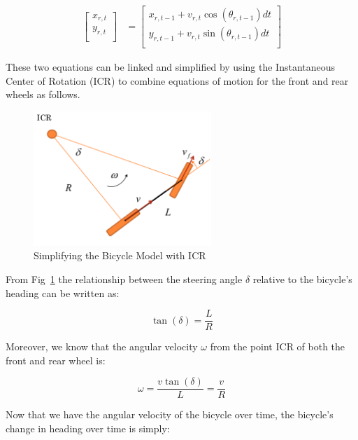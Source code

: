 \documentclass{article}
\begin{document}
\begin{align}
 	\begin{bmatrix}
        x_{r, t} \\
        y_{r, t} \\
    \end{bmatrix}  
    &=
    \begin{bmatrix}
	    x_{r, t - 1} + v_{r, t} \cos(\theta_{r, t - 1}) dt \\
		y_{r, t - 1} + v_{r, t} \sin(\theta_{r, t - 1}) dt \\
    \end{bmatrix}
\end{align}

These two equations can be linked and simplified by using the Instantaneous Center of Rotation (ICR) to combine equations of motion for the front and rear wheels as follows.

\begin{figure}[H]
	\centering
	\includegraphics[width=0.6\textwidth]{images/bicycle_icr.png}
	\caption{Simplifying the Bicycle Model with ICR}
	\label{fig:bicycle_icr}
\end{figure}

From Fig~\ref{fig:bicycle_icr} the relationship between the steering angle $\delta$ relative to the bicycle's heading can be written as:

\begin{equation}
	\label{eq:icr_steering_angle}
	\tan(\delta) = \dfrac{L}{R}
\end{equation}

Moreover, we know that the angular velocity $\omega$ from the point ICR of both the front and rear wheel is:

\begin{equation}
	\label{eq:icr_angluar_velocity}
	\omega = \dfrac{v \tan(\delta)}{L} = \dfrac{v}{R}
\end{equation}

Now that we have the angular velocity of the bicycle over time, the bicycle's change in heading over time is simply:
\end{document}
